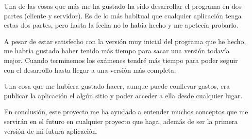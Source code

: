 Una de las cosas que más me ha gustado ha sido desarrollar el programa en dos partes (cliente y servidor). Es de lo más habitual que cualquier aplicación tenga estas dos partes, pero hasta la fecha no lo había hecho y me apetecía probarlo.

A pesar de estar satisfecho con la versión muy inicial del programa que he hecho, me habría gustado haber tenido más tiempo para sacar una versión todavía mejor. Cuando terminemos los exámenes tendré más tiempo para poder seguir con el desarrollo hasta llegar a una versión más completa.

Una cosa que me hubiera gustado hacer, aunque puede conllevar gastos, era publicar la aplicación el algún sitio y poder acceder a ella desde cualquier lugar.

En conclusión, este proyecto me ha ayudado a entender muchos conceptos que me servirán en el futuro en cualquier proyecto que haga, además de ser la primera versión de mi futura aplicación.



 